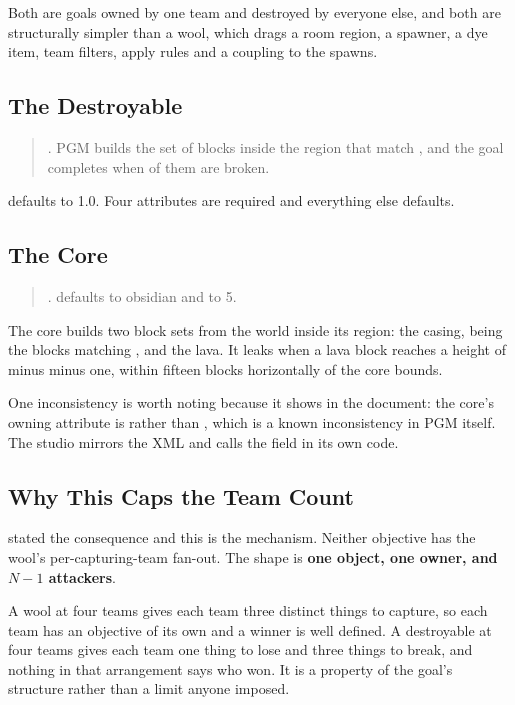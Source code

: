 Both are goals owned by one team and destroyed by everyone else, and both are
structurally simpler than a wool, which drags a room region, a spawner, a dye item,
team filters, apply rules and a coupling to the spawns.

\subsection{The Destroyable}

\begin{quote}
. PGM builds
the set of blocks inside the region that match , and the goal
completes when  of them are broken.
\end{quote}

 defaults to 1.0. Four attributes are required and everything else
defaults.

\subsection{The Core}

\begin{quote}
. 
defaults to obsidian and  to 5.
\end{quote}

The core builds two block sets from the world inside its region: the casing, being
the blocks matching , and the lava. It leaks when a lava block reaches
a height of  minus  minus one, within fifteen blocks
horizontally of the core bounds.

One inconsistency is worth noting because it shows in the document: the core's
owning attribute is  rather than , which is a known
inconsistency in PGM itself. The studio mirrors the XML and calls the field
 in its own code.

\subsection{Why This Caps the Team Count}

 stated the consequence and this is the mechanism. Neither
objective has the wool's per-capturing-team fan-out. The shape is \textbf{one
object, one owner, and $N-1$ attackers}.

A wool at four teams gives each team three distinct things to capture, so each team
has an objective of its own and a winner is well defined. A destroyable at four
teams gives each team one thing to lose and three things to break, and nothing in
that arrangement says who won. It is a property of the goal's structure rather than
a limit anyone imposed.

